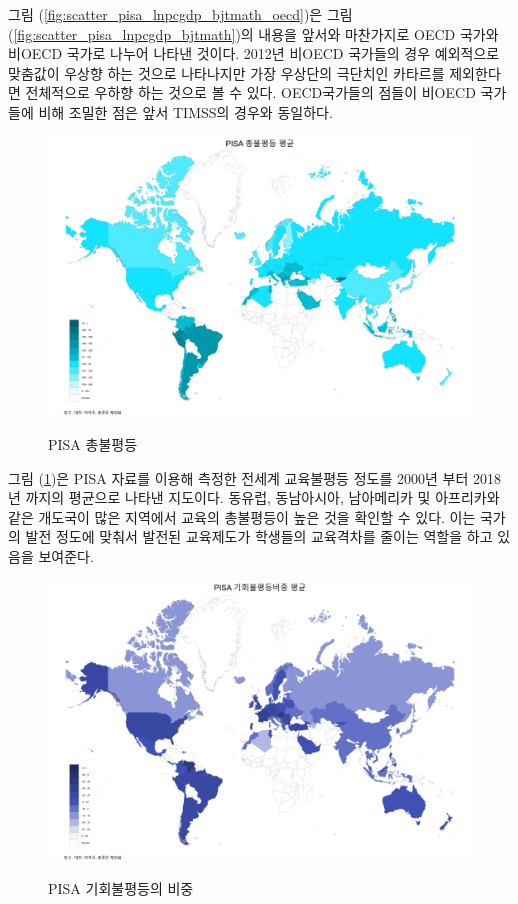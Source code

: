 그림 (\ref{fig:scatter_pisa_lnpcgdp_bjtmath_oecd})은 그림 (\ref{fig:scatter_pisa_lnpcgdp_bjtmath})의 내용을 앞서와 마찬가지로 OECD 국가와 비OECD 국가로 나누어 나타낸 것이다.
2012년 비OECD 국가들의 경우 예외적으로 맞춤값이 우상향 하는 것으로 나타나지만 가장 우상단의 극단치인 카타르를 제외한다면 전체적으로 우하향 하는 것으로 볼 수 있다.
 OECD국가들의 점들이 비OECD 국가들에 비해 조밀한 점은 앞서 TIMSS의 경우와 동일하다.
 
\begin{figure}[htpb]
    \centering
    \caption{PISA 총불평등}
    \includegraphics[width=\textwidth]{figure/map_bjtpisa_mean.png}
    \label{fig:map_bjtpisa_mean}
\end{figure}

그림 (\ref{fig:map_bjtpisa_mean})은 PISA 자료를 이용해 측정한 전세계 교육불평등 정도를 2000년 부터 2018년 까지의 평균으로 나타낸 지도이다.
동유럽, 동남아시아, 남아메리카 및 아프리카와 같은 개도국이 많은 지역에서 교육의 총불평등이 높은 것을 확인할 수 있다.
이는 국가의 발전 정도에 맞춰서 발전된 교육제도가 학생들의 교육격차를 줄이는 역할을 하고 있음을 보여준다.

\begin{figure}[htpb]
    \centering
    \caption{PISA 기회불평등의 비중}
    \includegraphics[width=\textwidth]{figure/map_bjrpisa_mean.png}
    \label{fig:map_bjrpisa_mean}
\end{figure}

